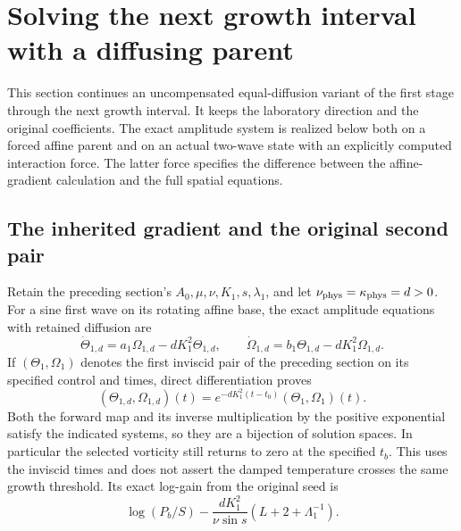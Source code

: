 \section{Solving the next growth interval with a diffusing parent}
\label{sec:cv-diffusive-parent}

This section continues an uncompensated equal-diffusion variant of the
first stage through the next growth interval. It keeps the laboratory
direction and the original coefficients. The exact amplitude system
is realized below both on a forced affine parent and on an actual
two-wave state with an explicitly computed interaction force.
The latter force specifies the difference between the affine-gradient
calculation and the full spatial equations.

\subsection{The inherited gradient and the original second pair}

Retain the preceding section's $A_0,\mu,\nu,K_1,s,\lambda_1$, and
let $\nu_{\rm phys}=\kappa_{\rm phys}=d>0$.
For a sine first wave on its rotating affine base, the exact amplitude
equations with retained diffusion are
\[
 \dot\Theta_{1,d}=a_1\Omega_{1,d}-dK_1^2\Theta_{1,d},\qquad
 \dot\Omega_{1,d}=b_1\Theta_{1,d}-dK_1^2\Omega_{1,d}.
\]
If $(\Theta_1,\Omega_1)$ denotes the first inviscid pair of the
preceding section on its specified control and times, direct
differentiation proves
\[
 (\Theta_{1,d},\Omega_{1,d})(t)
 =e^{-dK_1^2(t-t_0)}(\Theta_1,\Omega_1)(t).
\]
Both the forward map and its inverse multiplication by the positive
exponential satisfy the indicated systems, so they are a bijection
of solution spaces. In particular the selected vorticity still returns
to zero at the specified $t_b$. This uses the inviscid times and does
not assert the damped temperature crosses the same growth threshold.
Its exact log-gain from the original seed is
\[
 \log(P_b/S)-\frac{dK_1^2}{\nu\sin s}
                       (L+2+\Lambda_1^{-1}).
\]

